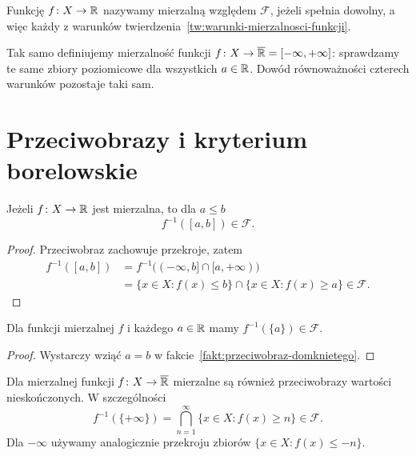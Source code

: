 \begin{definicja}
\label{def:funkcja-mierzalna}
Funkcję $f\colon X\to\mathbb{R}$ nazywamy mierzalną względem $\mathcal{F}$,
jeżeli spełnia dowolny, a więc każdy z warunków
twierdzenia~\ref{tw:warunki-mierzalnosci-funkcji}.
\end{definicja}

\begin{uwaga}
\label{uw:funkcja-mierzalna-rozszerzona}
Tak samo definiujemy mierzalność funkcji
$f\colon X\to\overline{\mathbb{R}}=[-\infty,+\infty]$:
sprawdzamy te same zbiory poziomicowe dla wszystkich $a\in\mathbb{R}$.
Dowód równoważności czterech warunków pozostaje taki sam.
\end{uwaga}

\section{Przeciwobrazy i kryterium borelowskie}
\label{sec:przeciwobrazy-borelowskie}

\begin{fakt}
\label{fakt:przeciwobraz-domknietego}
Jeżeli $f\colon X\to\mathbb{R}$ jest mierzalna, to dla $a\leq b$
\[
  f^{-1}([a,b])\in\mathcal{F}.
\]
\end{fakt}

\begin{proof}
Przeciwobraz zachowuje przekroje, zatem
\begin{align*}
  f^{-1}([a,b])
    &=f^{-1}\bigl((-\infty,b]\cap[a,+\infty)\bigr)\\
    &=\{x\in X:f(x)\leq b\}\cap\{x\in X:f(x)\geq a\}
      \in\mathcal{F}.
\end{align*}
\end{proof}

\begin{wniosek}
\label{wn:przeciwobraz-punktu}
Dla funkcji mierzalnej $f$ i każdego $a\in\mathbb{R}$ mamy
$f^{-1}(\{a\})\in\mathcal{F}$.
\end{wniosek}

\begin{proof}
Wystarczy wziąć $a=b$ w fakcie~\ref{fakt:przeciwobraz-domknietego}.
\end{proof}

\begin{uwaga}
Dla mierzalnej funkcji $f\colon X\to\overline{\mathbb{R}}$ mierzalne są również
przeciwobrazy wartości nieskończonych. W szczególności
\[
  f^{-1}(\{+\infty\})
  =\bigcap_{n=1}^{\infty}\{x\in X:f(x)\geq n\}\in\mathcal{F}.
\]
Dla $-\infty$ używamy analogicznie przekroju zbiorów
$\{x\in X:f(x)\leq-n\}$.
\end{uwaga}

